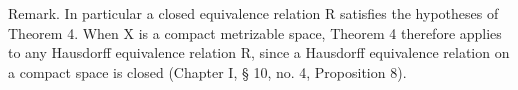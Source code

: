 Remark. In particular a closed equivalence relation R satisfies the hypotheses of Theorem 4. When X is a compact metrizable space, Theorem 4 therefore applies to any Hausdorff equivalence relation R, since a Hausdorff equivalence relation on a compact space is closed (Chapter I, § 10, no. 4, Proposition 8).

